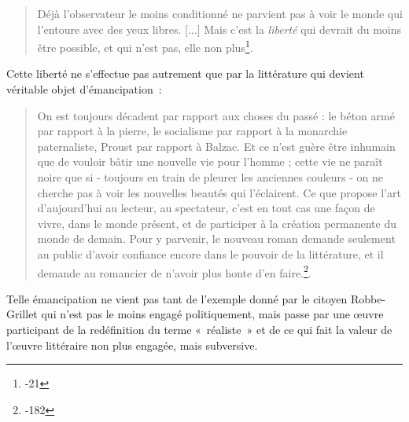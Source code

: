 \documentclass[12pt, a4paper]{article}
\begin{document}
\begin{quote}
    Déjà l'observateur le moins conditionné ne parvient pas à voir le monde qui l'entoure avec des yeux libres. [...] Mais c'est la \textit{liberté} qui devrait du moins être possible, et qui n'est pas, elle non plus\footnote{-21}.
\end{quote}
Cette liberté ne s'effectue pas autrement que par la littérature qui devient véritable objet d'émancipation~:
\begin{quote}
    On est toujours décadent par rapport aux choses du passé : le béton armé par rapport à la pierre, le socialisme par rapport à la monarchie paternaliste, Proust par rapport à Balzac. Et ce n'est guère être inhumain que de vouloir bâtir une nouvelle vie pour l'homme ; cette vie ne paraît noire que si - toujours en train de pleurer les anciennes couleurs - on ne cherche pas à voir les nouvelles beautés qui l'éclairent. Ce que propose l’art d’aujourd’hui au lecteur, au spectateur, c’est en tout cas une façon de vivre, dans le monde présent, et de participer à la création permanente du monde de demain. Pour y parvenir, le nouveau roman demande seulement au public d’avoir confiance encore dans le pouvoir de la littérature, et il demande au romancier de n’avoir plus honte d’en faire.\footnote{-182}.
\end{quote}

Telle émancipation ne vient pas tant de l'exemple donné par le citoyen Robbe-Grillet qui n'est pas le moins engagé politiquement, mais passe par une œuvre participant de la redéfinition du terme «~réaliste~» et de ce qui fait la valeur de l'œuvre littéraire non plus engagée, mais subversive.
\end{document}
